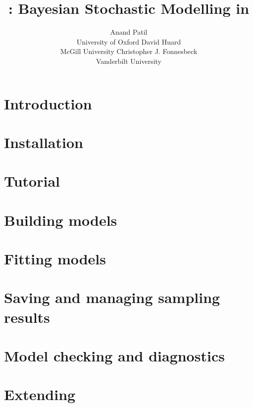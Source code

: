 \documentclass[]{jss_mod}
\author{Anand Patil\\University of Oxford \And
        David Huard\\McGill University  \And
		Christopher J. Fonnesbeck\\Vanderbilt University}
\title{\pkg{PyMC} : Bayesian Stochastic Modelling in \proglang{Python}}
\begin{document}
\maketitle

\cleardoublepage
{}

\section[Introduction]{Introduction}
\label{chap:intro}


\section[Installation]{Installation}
\label{chap:install}


\section[Tutorial]{Tutorial}
\label{chap:tutorial}


\section[Building Models]{Building models}
\label{chap:modelbuilding}


\section[Fitting Models]{Fitting models}
\label{chap:modelfitting}


\section[Sampling Results]{Saving and managing sampling results}
\label{chap:database}


\section[Model Checking]{Model checking and diagnostics}
\label{chap:modelchecking}


\section[Extending PyMC]{Extending }
\label{chap:extending}

\clearpage
\end{document}
